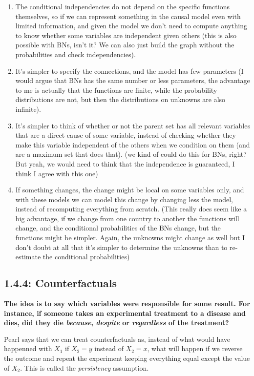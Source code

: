 \begin{enumerate}
    \item The conditional independencies do not depend on the specific functions themselves, so if we can represent something in the causal model even with limited information, and given the model we don't need to compute anything to know whether some variables are independent given others (this is also possible with BNs, isn't it? We can also just build the graph without the probabilities and check independencies).
    \item It's simpler to specify the connections, and the model has few parameters (I would argue that BNs has the same number or less parameters, the advantage to me is actually that the functions are finite, while the probability distributions are not, but then the distributions on unknowns are also infinite).
    \item It's simpler to think of whether or not the parent set has all relevant variables that are a direct cause of some variable, instead of checking whether they make this variable independent of the others when we condition on them (and are a maximum set that does that). (we kind of could do this for BNs, right? But yeah, we would need to think that the independence is guaranteed, I think I agree with this one)
    \item If something changes, the change might be local on some variables only, and with these models we can model this change by changing less the model, instead of recomputing everything from scratch. (This really does seem like a big advantage, if we change from one country to another the functions will change, and the conditional probabilities of the BNs change, but the functions might be simpler. Again, the unknowns might change as well but I don't doubt at all that it's simpler to determine the unknowns than to re-estimate the conditional probabilities)
\end{enumerate}


\subsection{1.4.4: Counterfactuals}

\textbf{The idea is to say which variables were responsible for some result. For instance, if someone takes an experimental treatment to a disease and dies, did they die \textit{because}, \textit{despite} or \textit{regardless} of the treatment?}

Pearl says that we can treat counterfactuals as, instead of what would have happenned with $X_1$ if $X_2 = y$ instead of $X_2 = x$, what will happen if we reverse the outcome and repeat the experiment keeping everything equal except the value of $X_2$. This is called the \textit{persistency} assumption. 

